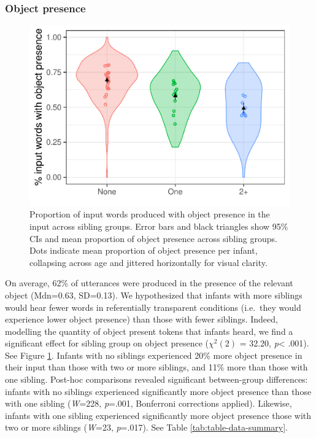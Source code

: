 \documentclass[
  english,
  man,floatsintext]{apa6}
\begin{document}
\hypertarget{object-presence}{%
\subsubsection{Object presence}\label{object-presence}}

\begin{figure}
\centering
\includegraphics{SiblingsStudyText_files/figure-latex/Figure-object-presence-1.pdf}
\caption{\label{fig:Figure-object-presence}Proportion of input words produced with object presence in the input across sibling groups. Error bars and black triangles show 95\% CIs and mean proportion of object presence across sibling groups. Dots indicate mean proportion of object presence per infant, collapsing across age and jittered horizontally for visual clarity.}
\end{figure}

On average, 62\% of utterances were produced in the presence of the relevant object (Mdn=0.63, SD=0.13). We hypothesized that infants with more siblings would hear fewer words in referentially transparent conditions (i.e.~they would experience lower object presence) than those with fewer siblings. Indeed, modelling the quantity of object present tokens that infants heard, we find a significant effect for sibling group on object presence (\(\chi^2 (2)\) = 32.20, \emph{p}\textless{} .001). See Figure \ref{fig:Figure-object-presence}. Infants with no siblings experienced 20\% more object presence in their input than those with two or more siblings, and 11\% more than those with one sibling. Post-hoc comparisons revealed significant between-group differences: infants with no siblings experienced significantly more object presence than those with one sibling (\emph{W}=228, \emph{p}=.001, Bonferroni corrections applied). Likewise, infants with one sibling experienced significantly more object presence those with two or more siblings (\emph{W}=23, \emph{p}=.017). See Table \ref{tab:table-data-summary}.
\end{document}

